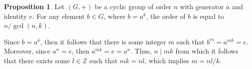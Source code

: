 \documentclass{article}
\makeatletter
\theoremstyle{definition}
\newtheorem{prop}{Proposition}[section]
\theoremstyle{remark}
\let\oldproofname=\proofname
\renewcommand{\proofname}{\bf{\textit{\oldproofname}}}
\theoremstyle{definition}
\renewenvironment{proof}[1][\proofname]{\par
  \pushQED{\qed}%
  \normalfont \topsep6\p@\@plus6\p@\relax
  \list{}{\leftmargin=0mm
          \rightmargin=0mm
          \settowidth{\itemindent}{\itshape#1}%
          \labelwidth=\itemindent
          \parsep=0pt \listparindent=0mm%
  }
  \item[\hskip\labelsep
        \itshape
    #1\@addpunct{.}]\ignorespaces
}{%
  \popQED\endlist\@endpefalse
}
\makeatother
\begin{document}
\begin{prop}
    Let $(G,+)$ be a cyclic group of order $n$ with generator $a$ and identity $e$. For any element $b\in G$, where $b=a^k$, the order of $b$ is equal to $n/\gcd(n,k)$. 
\end{prop}

\begin{proof}
    Since $b=a^k$, then it follows that there is some integer $m$ such that $b^m=a^{mk}=e$. Moreover, since $a^n=e$, then $a^{mk}=e=a^n$. Thus, $n\mid mk$ from which it follows that there exists some $l\in\mathbb{Z}$ such that $mk=nl$, which implies $m=nl/k$. 
\end{proof}
\end{document}
